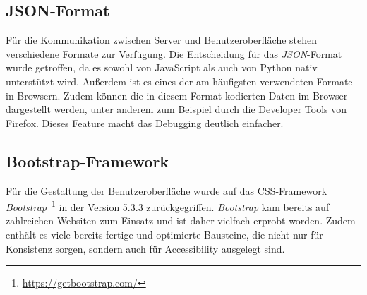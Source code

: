 \subsection{JSON-Format}

Für die Kommunikation zwischen Server und Benutzeroberfläche stehen verschiedene Formate zur Verfügung. Die Entscheidung für das \textit{JSON}-Format wurde getroffen, 
da es sowohl von JavaScript als auch von Python nativ unterstützt wird. Außerdem ist es eines der am häufigsten verwendeten Formate in Browsern.
Zudem können die in diesem Format kodierten Daten im Browser dargestellt werden, unter anderem
zum Beispiel durch die Developer Tools von Firefox. Dieses Feature macht das Debugging deutlich einfacher. 

\subsection{Bootstrap-Framework}

Für die Gestaltung der Benutzeroberfläche wurde auf das CSS-Framework \textit{Bootstrap}~\footnote{\hspace{1.5mm}\url{https://getbootstrap.com/}} in der Version 5.3.3 zurückgegriffen.
\textit{Bootstrap} kam bereits auf zahlreichen Websiten zum Einsatz und ist daher vielfach erprobt worden.
Zudem enthält es viele bereits fertige und optimierte Bausteine, die nicht nur für Konsistenz sorgen, sondern auch für Accessibility ausgelegt sind. 
